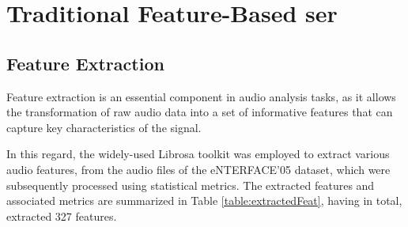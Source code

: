 \section{Traditional Feature-Based \ac{ser}}


\subsection{Feature Extraction}

Feature extraction is an essential component in audio analysis tasks, as it allows the transformation of raw audio data into a set of informative features that can capture key characteristics of the signal.

In this regard, the widely-used Librosa toolkit was employed to extract various audio features, from the audio files of the eNTERFACE'05 dataset, which were subsequently processed using statistical metrics. The extracted features and associated metrics are summarized in Table \ref{table:extractedFeat}, having in total, extracted 327 features.

